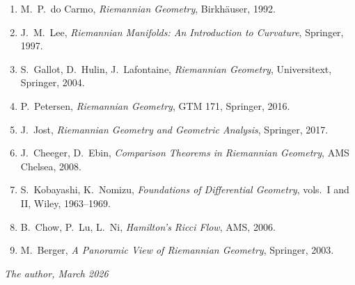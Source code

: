 \begin{enumerate}
    \item M.~P.~do Carmo, \emph{Riemannian Geometry}, Birkh\"auser, 1992.
    \item J.~M.~Lee, \emph{Riemannian Manifolds: An Introduction to Curvature},
          Springer, 1997.
    \item S.~Gallot, D.~Hulin, J.~Lafontaine, \emph{Riemannian Geometry},
          Universitext, Springer, 2004.
    \item P.~Petersen, \emph{Riemannian Geometry}, GTM 171, Springer, 2016.
    \item J.~Jost, \emph{Riemannian Geometry and Geometric Analysis}, Springer, 2017.
    \item J.~Cheeger, D.~Ebin, \emph{Comparison Theorems in Riemannian Geometry},
          AMS Chelsea, 2008.
    \item S.~Kobayashi, K.~Nomizu, \emph{Foundations of Differential Geometry},
          vols.~I and II, Wiley, 1963--1969.
    \item B.~Chow, P.~Lu, L.~Ni, \emph{Hamilton's Ricci Flow}, AMS, 2006.
    \item M.~Berger, \emph{A Panoramic View of Riemannian Geometry}, Springer, 2003.
\end{enumerate}

\bigskip
\hfill\emph{The author, March 2026}
